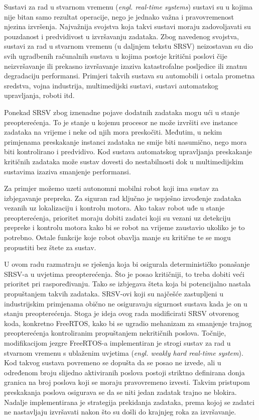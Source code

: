 \documentclass[../zavrsni.tex]{subfiles}
\begin{document}
\sloppy

\justifying



Sustavi za rad u stvarnom vremenu (\textit{engl. real-time systems}) sustavi su u kojima nije bitan samo
rezultat operacije, nego je jednako važna i pravovremenost njezina izvršenja. Najvažnija svojstva koja takvi sustavi moraju
zadovoljavati su pouzdanost i predvidivost u izvršavanju zadataka.
Zbog navedenog svojstva, sustavi za rad u stvarnom vremenu (u daljnjem tekstu SRSV) neizostavan su dio svih ugradbenih 
računalnih sustava u kojima postoje kritični poslovi čije neizvršavanje ili prekasno izvršavanje izaziva katastrofalne
posljedice ili znatnu degradaciju performansi. Primjeri takvih sustava su automobili i ostala prometna sredstva, vojna industrija, 
multimedijski sustavi, sustavi automatskog upravljanja, roboti itd. 

Ponekad SRSV zbog iznenadne pojave dodatnih zadataka mogu ući u stanje preopterećenja. To je stanje u kojemu procesor ne može 
izvršiti sve instance zadataka na vrijeme i neke od njih mora preskočiti. Međutim, u nekim primjenama preskakanje instanci zadataka ne smije biti nasumično, nego
mora biti kontrolirano i predvidivo. Kod sustava automatskog upravljanja preskakanje kritičnih zadataka može sustav dovesti do nestabilnosti dok u 
multimedijskim sustavima izaziva smanjenje performansi.
  
Za primjer možemo uzeti autonomni mobilni robot koji ima sustav za izbjegavanje prepreka. Za siguran rad ključno je uspješno izvođenje zadataka
vezanih uz lokalizaciju i kontrolu motora. Ako takav robot uđe u stanje preopterećenja, prioritet 
moraju dobiti zadatci koji su vezani uz detekciju prepreke i kontrolu motora kako bi se robot na vrijeme zaustavio ukoliko je to potrebno.
Ostale funkcije koje robot obavlja manje su kritične te se mogu propustiti bez štete za sustav.

U ovom radu razmatraju se rješenja koja bi osigurala determinističko ponašanje SRSV-a u uvjetima preopterećenja. Što je posao kritičniji,
to treba dobiti veći prioritet pri raspoređivanju. Tako se izbjegava šteta koja bi potencijalno nastala propuštanjem takvih zadataka. 
SRSV-ovi koji su najčešće zastupljeni u industrijskim primjenama obično ne osiguravaju sigurnost sustava kada je on u stanju preopterećenja. Stoga je ideja ovog rada 
modificirati SRSV otvorenog koda, konkretno FreeRTOS, kako bi se ugradio mehanizam za smanjenje trajnog preopterećenja kontroliranim 
propuštanjem nekritičnih poslova. Točnije,  
modifikacijom jezgre FreeRTOS-a implementiran je strogi sustav za rad u stvarnom vremenu s ublaženim uvjetima (\textit{engl. weakly hard real-time system}). Kod takvog sustava
povremeno se dopušta da se posao ne izvede, ali u određenom broju slijedno aktiviranih poslova postoji striktno definirana donja granica na broj 
poslova koji se moraju pravovremeno izvesti.
Takvim pristupom preskakanja poslova osigurava se da se niti jedan zadatak trajno ne blokira. Nadalje implementirana je strategija 
prekidanja zadataka, prema kojoj se zadatci ne nastavljaju izvršavati nakon što su došli do krajnjeg roka za izvršavanje.
\end{document}
